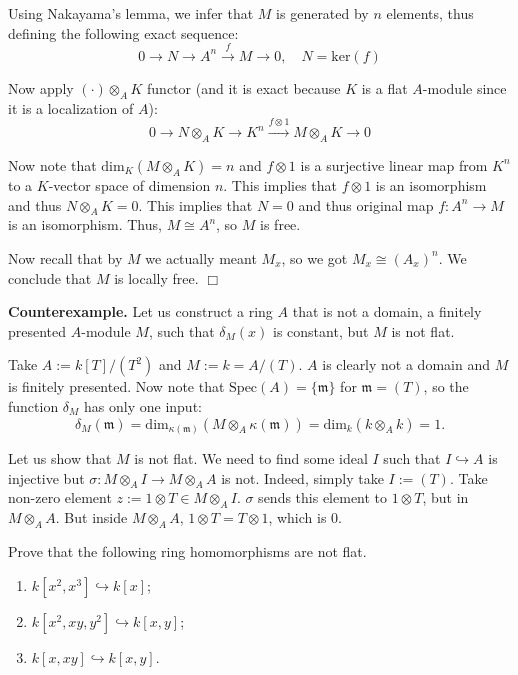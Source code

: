 \documentclass{template}
\newcommand{\qedwhite}{\hfill \ensuremath{\Box}}
\begin{document}
Using Nakayama's lemma, we infer that $M$ is generated by $n$ elements, thus
defining the following exact sequence:
\begin{equation*}
    0 \to N \to A^n \xrightarrow{f} M \to 0, \quad N = \text{ker}(f)
\end{equation*}

Now apply $(\cdot)\otimes_A K$ functor (and it is exact because $K$ is a flat
$A$-module since it is a localization of $A$):
\begin{equation*}
    0 \to N \otimes_A K \to K^n \xrightarrow{f \otimes 1} M \otimes_A K \to 0
\end{equation*}

Now note that $\text{dim}_K(M \otimes_A K) = n$ and $f \otimes 1$ is a
surjective linear map from $K^n$ to a $K$-vector space of dimension $n$. This
implies that $f \otimes 1$ is an isomorphism and thus $N \otimes_A K = 0$. This
implies that $N=0$ and thus original map $f: A^n \to M$ is an isomorphism. Thus,
$M \cong A^n$, so $M$ is free.

Now recall that by $M$ we actually meant $M_x$, so we got $M_x \cong (A_x)^n$.
We conclude that $M$ is locally free. \qedwhite

\textbf{Counterexample.} Let us construct a ring $A$ that is not a domain,
a finitely presented $A$-module $M$, such that $\delta_M(x)$ is constant, 
but $M$ is not flat.

Take $A := k[T]/(T^2)$ and $M := k = A/(T)$. $A$ is clearly not a domain and $M$
is finitely presented. Now note that $\text{Spec}(A) = \{\mathfrak{m}\}$ for
$\mathfrak{m}=(T)$, so the function $\delta_M$ has only one input:
\begin{equation*}
    \delta_M(\mathfrak{m}) = \text{dim}_{\kappa(\mathfrak{m})}(M \otimes_A \kappa(\mathfrak{m})) = \text{dim}_k(k \otimes_A k) = 1.
\end{equation*}

Let us show that $M$ is not flat. We need to find some ideal $I$ such that $I
\hookrightarrow A$ is injective but $\sigma: M \otimes_A I \to M \otimes_A A$ is
not. Indeed, simply take $I := (T)$. Take non-zero element $z := 1 \otimes T \in
M \otimes_A I$. $\sigma$ sends this element to $1 \otimes T$, but in $M
\otimes_A A$. But inside $M \otimes_A A$, $1 \otimes T = T \otimes 1$, which 
is $0$.

\begin{problem}[Exercise 2]
    Prove that the following ring homomorphisms are not flat.
    \begin{enumerate}
        \item[(a)] $k[x^2,x^3] \hookrightarrow k[x]$;
        \item[(b)] $k[x^2,xy,y^2] \hookrightarrow k[x,y]$;
        \item[(c)] $k[x,xy] \hookrightarrow k[x,y]$.  
    \end{enumerate}
\end{problem}
\end{document}
